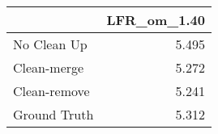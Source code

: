 \begin{tabular}{lr}
\toprule
{} & LFR_om_1.40 \\
\midrule
No Clean Up  &       5.495 \\
Clean-merge  &       5.272 \\
Clean-remove &       5.241 \\
Ground Truth &       5.312 \\
\bottomrule
\end{tabular}
